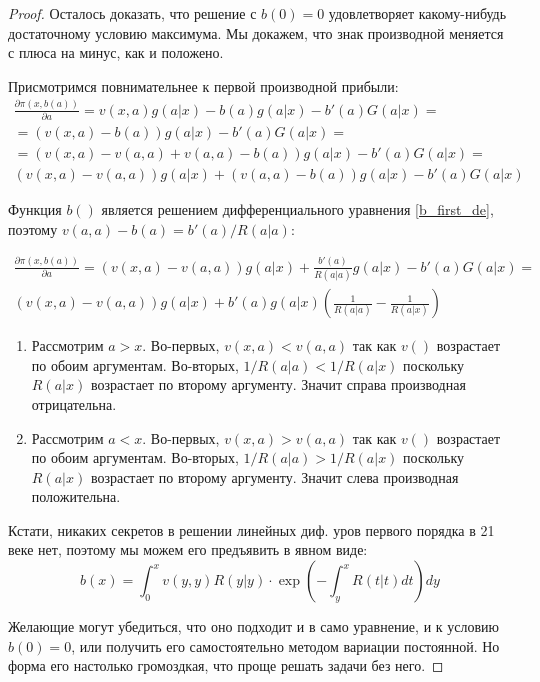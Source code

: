 \begin{itemize}
\begin{proof}
Осталось доказать, что решение с $ b(0)=0 $ удовлетворяет какому-нибудь достаточному условию максимума. Мы докажем, что знак производной меняется с плюса на минус, как и положено.


Присмотримся повнимательнее к первой производной прибыли:
\begin{multline}
\frac{\partial \pi(x,b(a))}{\partial a}=v(x,a)g(a|x)-b(a)g(a|x)-b'(a)G(a|x)=\\
=(v(x,a)-b(a))g(a|x)-b'(a)G(a|x)=\\
=(v(x,a)-v(a,a)+v(a,a)-b(a))g(a|x)-b'(a)G(a|x)=\\
(v(x,a)-v(a,a))g(a|x)+(v(a,a)-b(a))g(a|x)-b'(a)G(a|x)
\end{multline}

Функция $ b() $ является решением дифференциального уравнения \ref{b_first_de}, поэтому $ v(a,a)-b(a)=b'(a)/R(a|a) $:

\begin{multline}
\frac{\partial \pi(x,b(a))}{\partial a}=(v(x,a)-v(a,a))g(a|x)+\frac{b'(a)}{R(a|a)}g(a|x)-b'(a)G(a|x)=\\
(v(x,a)-v(a,a))g(a|x)+b'(a)g(a|x)\left(\frac{1}{R(a|a)}-\frac{1}{R(a|x)} \right)
\end{multline}

\begin{enumerate}
\item Рассмотрим $ a>x $. Во-первых, $ v(x,a)<v(a,a) $ так как $ v() $ возрастает по обоим аргументам. Во-вторых, $1/R(a|a)<1/R(a|x) $ поскольку $ R(a|x) $ возрастает по второму аргументу. Значит справа производная отрицательна.
\item Рассмотрим $ a<x $. Во-первых, $ v(x,a)>v(a,a) $ так как $ v() $ возрастает по обоим аргументам. Во-вторых, $1/R(a|a)>1/R(a|x) $ поскольку $ R(a|x) $ возрастает по второму аргументу. Значит слева производная положительна.
\end{enumerate}

Кстати, никаких секретов в решении линейных диф. уров первого порядка в 21 веке нет, поэтому мы можем его предъявить в явном виде:
\begin{equation}
b(x)=\int_{0}^{x}v(y,y)R(y|y)\cdot \exp\left(-\int_{y}^{x}R(t|t)dt\right) dy
\end{equation}

Желающие могут убедиться, что оно подходит и в само уравнение, и к условию $ b(0)=0 $, или получить его самостоятельно методом вариации постоянной. Но форма его настолько громоздкая, что проще решать задачи без него.
\end{proof}


\end{itemize}

